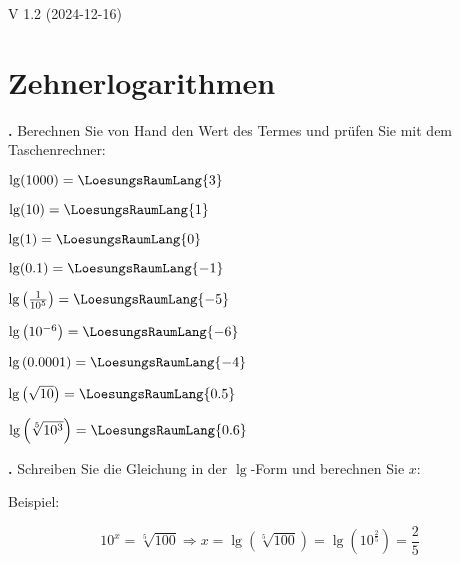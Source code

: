
\renewcommand{\bbwAufgabenBlockID}{A2Log}

\renewcommand{\metaHeaderLine}{Logarithmen}
\renewcommand{\arbeitsblattTitel}{Algebra: Logarithmen}

\ifisNURAUFGABEN
\renewcommand{\abplz}[1]{\vspace{1mm}}
\fi

\newcommand{\seitenUmbruchImAufgabenteil}{
\ifisNURAUFGABEN
\else
\noTRAINER{\newpage}
\fi
}%


\arbeitsblattHeader{}

\begin{center}V 1.2 (2024-12-16) \end{center}
\section{Zehnerlogarithmen}

\textbf{\bbwAufgabenNummer{}.}
Berechnen Sie von Hand den Wert des Termes und prüfen Sie mit dem Taschenrechner:

\begin{bbwAufgabenBlock}
\item $\lg(1000) = \LoesungsRaumLang{3}$\abplz{2}
\item $\lg(10) = \LoesungsRaumLang{1}$\abplz{2}
\item $\lg(1) = \LoesungsRaumLang{0}$\abplz{2}
\item $\lg(0.1) = \LoesungsRaumLang{-1}$\abplz{2}
\item $\lg\left(\frac1{10^5}\right) = \LoesungsRaumLang{-5}$\abplz{2}
\item $\lg\left(10^{-6}\right) = \LoesungsRaumLang{-6}$\abplz{2}
\item $\lg\left(0.0001\right) = \LoesungsRaumLang{-4}$\abplz{2}
\item $\lg\left(\sqrt{10}\right) = \LoesungsRaumLang{0.5}$\abplz{2}
\item $\lg\left(\sqrt[5]{10^3}\right) = \LoesungsRaumLang{0.6}$\abplz{2}
\end{bbwAufgabenBlock}

\newpage


\textbf{\bbwAufgabenNummer{}.}
Schreiben Sie die Gleichung in der $\lg$-Form und berechnen Sie $x$:

Beispiel:

$$10^x=\sqrt[5]{100} \Longrightarrow   x=\lg\left(\sqrt[5]{100}\right)
= \lg\left(10^{\frac25}\right) = \frac25$$

